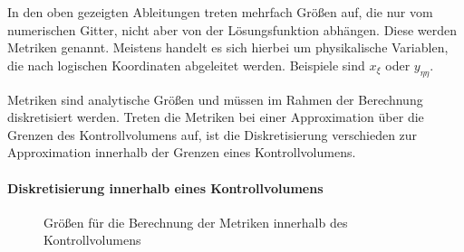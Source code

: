 In den oben gezeigten Ableitungen treten mehrfach Größen auf, die nur vom numerischen Gitter, nicht aber
von der Lösungsfunktion abhängen. Diese werden Metriken genannt.
Meistens handelt es sich hierbei um physikalische Variablen, die nach logischen Koordinaten abgeleitet werden.
Beispiele sind $x_{\xi}$ oder $y_{\eta\eta}$.

Metriken sind analytische Größen und müssen im Rahmen der Berechnung diskretisiert werden.
Treten die Metriken bei einer Approximation über die Grenzen des Kontrollvolumens auf,
ist die Diskretisierung verschieden zur Approximation innerhalb der Grenzen eines Kontrollvolumens.

\paragraph{Diskretisierung innerhalb eines Kontrollvolumens}
\begin{figure}[ht]
  
\centering
\caption{Größen für die Berechnung der Metriken innerhalb des Kontrollvolumens}
\end{figure}

